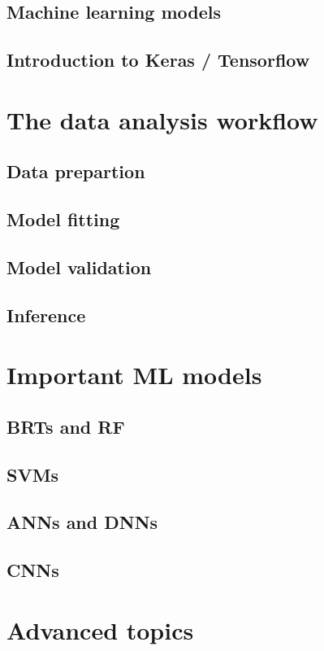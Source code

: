 \documentclass[a4paper,twoside]{tufte-book}\usepackage[]{graphicx}\usepackage[]{color}
\begin{document}
\section{Machine learning models}

\section{Introduction to Keras / Tensorflow}


\chapter{The data analysis workflow}


\section{Data prepartion}

\section{Model fitting}

\section{Model validation}

\section{Inference}


\chapter{Important ML models}

\section{BRTs and RF}

\section{SVMs}

\section{ANNs and DNNs}

\section{CNNs}

\chapter{Advanced topics}



 
\end{document}
